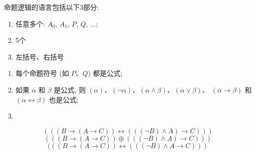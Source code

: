 \begin{frame}[fragile]{}
  \begin{definition}[命题逻辑的语言]
    命题逻辑的语言包括以下3部分:
    \begin{enumerate}[(1)]
      \setlength{\itemsep}{5pt}
      \item 任意多个: $A_{0}$, $A_{1}$, $P$, $Q$, $\dots$;
      \item 5个
        
      \item 左括号、右括号 
    \end{enumerate}
  \end{definition}
\end{frame}

\begin{frame}{}
  \begin{definition}
    \begin{enumerate}[(1)]
      \setlength{\itemsep}{8pt}
      \item 每个命题符号 (如 $P$、$Q$) 都是公式;
      \item 如果 $\alpha$ 和 $\beta$ 是公式,
        则 $(\alpha)$、$(\lnot \alpha)$、$(\alpha \land \beta)$、$(\alpha \lor \beta)$、
        $(\alpha \to \beta)$ 和 $(\alpha \leftrightarrow \beta)$ 也是公式;
      \item {}
    \end{enumerate}
  \end{definition}

  \pause
  \[
    (((B \to (A \to C)) \leftrightarrow (((\lnot B) \land A) \to C)))
  \]
  \pause
  \[
    (((B \to (A \to C)) \oplus (((\lnot B) \land A) \to C)))
  \]
  \pause
  \[
    (((B \to (A \to C)) \leftrightarrow (((\lnot B) \land A \to C)))
  \]
\end{frame}

